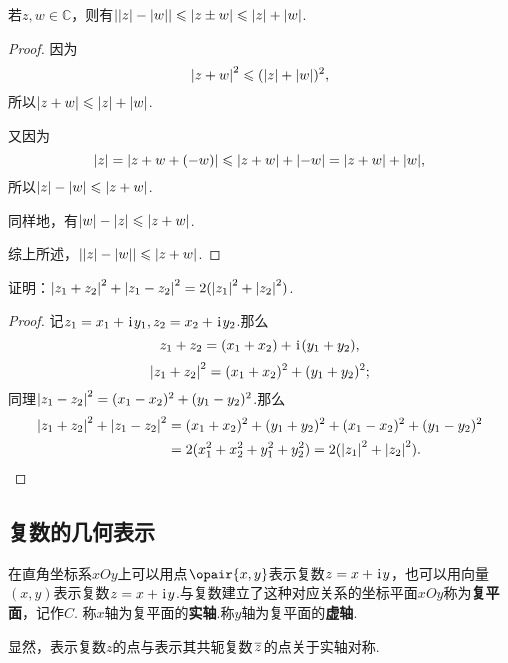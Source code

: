 \begin{theorem}[三角不等式]
若\(z,w \in \mathbb{C}\)，则有\(\abs{\abs{z}-\abs{w}} \leqslant \abs{z \pm w} \leqslant \abs{z} + \abs{w}\).
\begin{proof}
因为\[
\abs{z + w}^2 \leqslant (\abs{z} + \abs{w})^2,
\]所以\(\abs{z + w} \leqslant \abs{z} + \abs{w}\).

又因为\[
\abs{z} = \abs{z + w + (-w)} \leqslant \abs{z+w} + \abs{-w} = \abs{z+w} + \abs{w},
\]所以\(\abs{z}-\abs{w} \leqslant \abs{z+w}\).

同样地，有\(\abs{w}-\abs{z} \leqslant \abs{z+w}\).

综上所述，\(\abs{\abs{z}-\abs{w}}\leqslant\abs{z+w}\).
\end{proof}
\end{theorem}

\begin{example}
证明：\(\abs{z_1+z_2}^2 + \abs{z_1-z_2}^2 = 2 (\abs{z_1}^2 + \abs{z_2}^2)\).
\begin{proof}
记\(z_1 = x_1 + \kern1pt\mathrm{i}\kern1pt y_1, z_2 = x_2 + \kern1pt\mathrm{i}\kern1pt y_2\).那么\[
z_1+z_2 = (x_1+x_2) + \kern1pt\mathrm{i}\kern1pt(y_1+y_2),
\]\[
\abs{z_1+z_2}^2 = (x_1+x_2)^2 + (y_1+y_2)^2;
\]同理\(\abs{z_1-z_2}^2 = (x_1-x_2)^2 + (y_1-y_2)^2\).那么\begin{align*}
\abs{z_1+z_2}^2 + \abs{z_1-z_2}^2
&= (x_1+x_2)^2 + (y_1+y_2)^2
+ (x_1-x_2)^2 + (y_1-y_2)^2 \\
&= 2 ( x_1^2 + x_2^2 + y_1^2 + y_2^2 )
= 2 ( \abs{z_1}^2 + \abs{z_2}^2 ).
\qedhere
\end{align*}
\end{proof}
\end{example}

\subsection{复数的几何表示}
\begin{definition}[复数在复平面上的几何表示]
在直角坐标系\(xOy\)上可以用点\(\opair{x,y}\)表示复数\(z=x+\kern1pt\mathrm{i}\kern1pt y\)，也可以用向量\((x,y)\)表示复数\(z=x+\kern1pt\mathrm{i}\kern1pt y\).与复数建立了这种对应关系的坐标平面\(xOy\)称为\textbf{复平面}，记作\(C\).
称\(x\)轴为复平面的\textbf{实轴}.称\(y\)轴为复平面的\textbf{虚轴}.

显然，表示复数\(z\)的点与表示其共轭复数\(\kern1pt\overline{z}\kern1pt\)的点关于实轴对称.
\end{definition}

